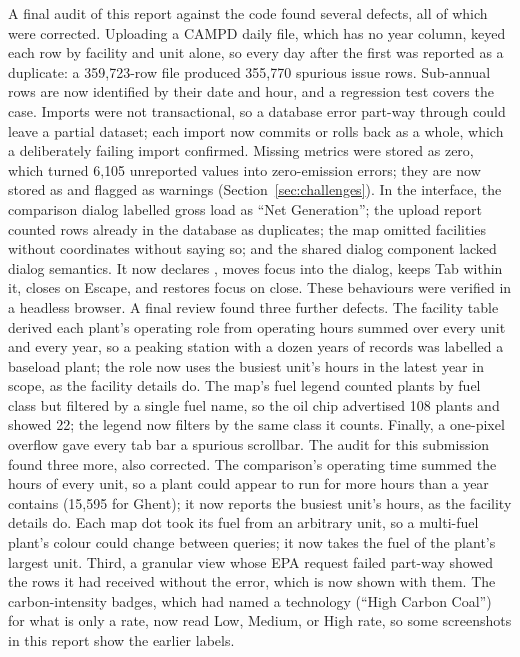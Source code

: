 \documentclass[11pt,a4paper]{article}
\begin{document}
A final audit of this report against the code found several defects, all of which were
corrected. Uploading a CAMPD daily file, which has no year column, keyed each row by facility and
unit alone, so every day after the first was reported as a duplicate: a 359{,}723-row file
produced 355{,}770 spurious issue rows. Sub-annual rows are now identified by their date and
hour, and a regression test covers the case. Imports were not transactional, so a database
error part-way through could leave a partial dataset; each import now commits or rolls back as a
whole, which a deliberately failing import confirmed. Missing metrics were stored as zero, which
turned 6{,}105 unreported \COtwo{} values into zero-emission errors; they are now stored as
 and flagged as warnings (Section~\ref{sec:challenges}). In the interface, the
comparison dialog labelled gross load as ``Net Generation''; the upload report counted rows
already in the database as duplicates; the map omitted facilities without coordinates without
saying so; and the shared dialog component lacked dialog semantics. It now declares
, moves focus into the dialog, keeps Tab within it, closes on Escape,
and restores focus on close. These behaviours were verified in a
headless browser. A final review found three further defects. The facility table derived each
plant's operating role from operating hours summed over every unit and every year, so a
peaking station with a dozen years of records was labelled a baseload plant; the role now uses
the busiest unit's hours in the latest year in scope, as the facility details do. The map's fuel
legend counted plants by fuel class but filtered by a single fuel name, so the oil chip
advertised 108 plants and showed 22; the legend now filters by the same class it counts. Finally,
a one-pixel overflow gave every tab bar a spurious scrollbar. The audit for this submission
found three more, also corrected. The comparison's operating time summed the hours of every
unit, so a plant could appear to run for more hours than a year contains (15{,}595 for Ghent);
it now reports the busiest unit's hours, as the facility details do. Each map dot took its
fuel from an arbitrary unit, so a multi-fuel plant's colour could change between queries; it
now takes the fuel of the plant's largest unit. Third, a granular view whose EPA request
failed part-way showed the rows it had received without the error, which is now shown with
them. The carbon-intensity badges, which had named a technology (``High Carbon Coal'') for what
is only a rate, now read Low, Medium, or High \COtwo{} rate, so some screenshots in
this report show the earlier labels.
\end{document}
